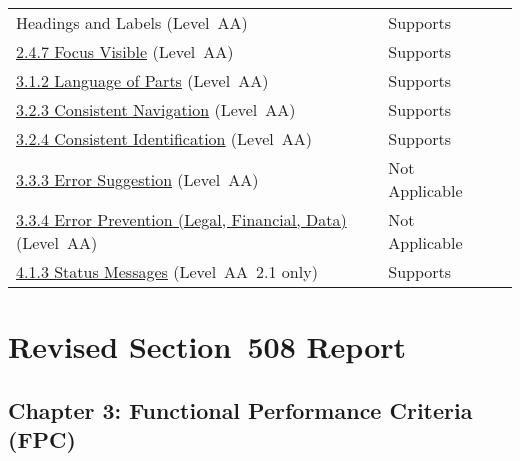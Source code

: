 \documentclass{report}
\begin{document}
\begin{longtable}{p{}<{\RaggedRight}p{}<{\RaggedRight}p{}<{\RaggedRight}}
{  Headings and Labels} (Level~AA) & Supports\\
  \href{http://www.w3.org/TR/WCAG20/#navigation-mechanisms-focus-visible}{2.4.7
  Focus Visible} (Level~AA) & Supports\\
  \href{http://www.w3.org/TR/WCAG20/#meaning-other-lang-id}{3.1.2
  Language of Parts} (Level~AA) & Supports\\
  \href{http://www.w3.org/TR/WCAG20/#consistent-behavior-consistent-locations}{3.2.3
  Consistent Navigation} (Level~AA) & Supports\\
  \href{http://www.w3.org/TR/WCAG20/#consistent-behavior-consistent-functionality}{3.2.4
  Consistent Identification} (Level~AA) & Supports\\
  \href{http://www.w3.org/TR/WCAG20/#minimize-error-suggestions}{3.3.3
  Error Suggestion} (Level~AA) & Not Applicable\\
  \href{http://www.w3.org/TR/WCAG20/#minimize-error-reversible}{3.3.4
  Error Prevention (Legal, Financial, Data)} (Level~AA) & Not
                                                          Applicable\\
  \href{https://www.w3.org/TR/WCAG21/#status-messages}{4.1.3 Status
  Messages} (Level~AA~2.1 only) & Supports\\
\end{longtable}


\section{Revised Section~508 Report}
\label{sec:sec508}

\subsection{Chapter 3: Functional Performance Criteria (FPC)}
\label{sec:508-3}
\end{document}
